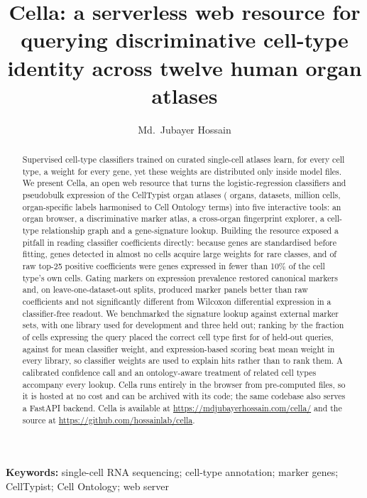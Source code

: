 \documentclass[11pt]{article}
\title{\textbf{Cella: a serverless web resource for querying discriminative cell-type identity across twelve human organ atlases}}
\author[1,2,*]{Md.~Jubayer Hossain}
\affil[1]{Center for Health Innovation, Research, Action, and Learning -- Bangladesh, Dhaka, Bangladesh}
\affil[2]{DeepBio, Dhaka, Bangladesh}
\affil[*]{Corresponding author: \href{mailto:contact.jubayerhossain@gmail.com}{contact.jubayerhossain@gmail.com}}
\date{}
\newcommand{\cella}{Cella}
\begin{document}
\maketitle

\begin{abstract}
\noindent
Supervised cell-type classifiers trained on curated single-cell atlases learn, for every cell type, a weight for every gene, yet these weights are distributed only inside model files. We present \cella{}, an open web resource that turns the logistic-regression classifiers and pseudobulk expression of the CellTypist organ atlases (\nOrgans{} organs, \nDatasets{} datasets, \nCells{} million cells, \nLabels{} organ-specific labels harmonised to \nCLTerms{} Cell Ontology terms) into five interactive tools: an organ browser, a discriminative marker atlas, a cross-organ fingerprint explorer, a cell-type relationship graph and a gene-signature lookup. Building the resource exposed a pitfall in reading classifier coefficients directly: because genes are standardised before fitting, genes detected in almost no cells acquire large weights for rare classes, and \gateFracAll{} of raw top-25 positive coefficients were genes expressed in fewer than 10\% of the cell type's own cells. Gating markers on expression prevalence restored canonical markers and, on \pnSplits{} leave-one-dataset-out splits, produced marker panels better than raw coefficients and not significantly different from Wilcoxon differential expression in a classifier-free readout. We benchmarked the signature lookup against \lkScored{} external marker sets, with one library used for development and three held out; ranking by the fraction of cells expressing the query placed the correct cell type first for \lkExprTopOne{} of held-out queries, against \lkWmeanTopOne{} for mean classifier weight, and expression-based scoring beat mean weight in every library, so classifier weights are used to explain hits rather than to rank them. A calibrated confidence call and an ontology-aware treatment of related cell types accompany every lookup. \cella{} runs entirely in the browser from pre-computed files, so it is hosted at no cost and can be archived with its code; the same codebase also serves a FastAPI backend. \cella{} is available at \url{https://mdjubayerhossain.com/cella/} and the source at \url{https://github.com/hossainlab/cella}.
\end{abstract}

\noindent\textbf{Keywords:} single-cell RNA sequencing; cell-type annotation; marker genes; CellTypist; Cell Ontology; web server
\end{document}

